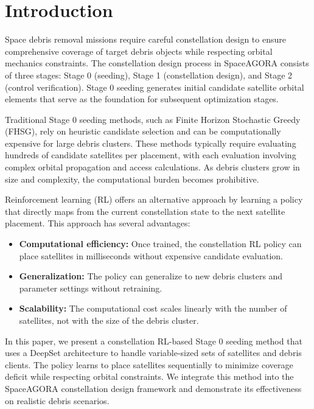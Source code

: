 \section{Introduction}

Space debris removal missions require careful constellation design to ensure comprehensive coverage of target debris objects while respecting orbital mechanics constraints. The constellation design process in SpaceAGORA consists of three stages: Stage 0 (seeding), Stage 1 (constellation design), and Stage 2 (control verification). Stage 0 seeding generates initial candidate satellite orbital elements that serve as the foundation for subsequent optimization stages.

Traditional Stage 0 seeding methods, such as Finite Horizon Stochastic Greedy (FHSG), rely on heuristic candidate selection and can be computationally expensive for large debris clusters. These methods typically require evaluating hundreds of candidate satellites per placement, with each evaluation involving complex orbital propagation and access calculations. As debris clusters grow in size and complexity, the computational burden becomes prohibitive.

Reinforcement learning (RL) offers an alternative approach by learning a policy that directly maps from the current constellation state to the next satellite placement. This approach has several advantages:
\begin{itemize}
    \item \textbf{Computational efficiency:} Once trained, the constellation RL policy can place satellites in milliseconds without expensive candidate evaluation.
    \item \textbf{Generalization:} The policy can generalize to new debris clusters and parameter settings without retraining.
    \item \textbf{Scalability:} The computational cost scales linearly with the number of satellites, not with the size of the debris cluster.
\end{itemize}

In this paper, we present a constellation RL-based Stage 0 seeding method that uses a DeepSet architecture to handle variable-sized sets of satellites and debris clients. The policy learns to place satellites sequentially to minimize coverage deficit while respecting orbital constraints. We integrate this method into the SpaceAGORA constellation design framework and demonstrate its effectiveness on realistic debris scenarios.

